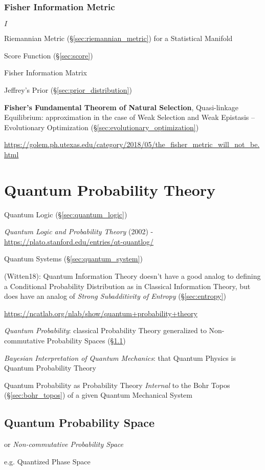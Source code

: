 \subsubsection{Fisher Information Metric}\label{sec:fisher_metric}

$I$

Riemannian Metric (\S\ref{sec:riemannian_metric}) for a Statistical Manifold

Score Function (\S\ref{sec:score})

Fisher Information Matrix

Jeffrey's Prior (\S\ref{sec:prior_distribution})

\fist \textbf{Fisher's Fundamental Theorem of Natural Selection},
Quasi-linkage Equilibrium: approximation in the case of Weak Selection
and Weak Epistasis -- Evolutionary Optimization
(\S\ref{sec:evolutionary_optimization}) %

\url{https://golem.ph.utexas.edu/category/2018/05/the_fisher_metric_will_not_be.html}



\section{Quantum Probability Theory}\label{sec:quantum_probability}

Quantum Logic (\S\ref{sec:quantum_logic})

\emph{Quantum Logic and Probability Theory} (2002) -
\url{https://plato.stanford.edu/entries/qt-quantlog/}

Quantum Systems (\S\ref{sec:quantum_system})

(Witten18): Quantum Information Theory doesn't have a good analog to defining a
Conditional Probability Distribution as in Classical Information Theory, but
does have an analog of \emph{Strong Subadditivity of Entropy}
(\S\ref{sec:entropy})

\url{https://ncatlab.org/nlab/show/quantum+probability+theory}

\emph{Quantum Probability}: classical Probability Theory generalized to
Non-commutative Probability Spaces (\S\ref{sec:quantum_probability_space})

\emph{Bayesian Interpretation of Quantum Mechanics}: that Quantum Physics is
Quantum Probability Theory

Quantum Probability as Probability Theory \emph{Internal} to the Bohr Topos
(\S\ref{sec:bohr_topos}) of a given Quantum Mechanical System



\subsection{Quantum Probability Space}\label{sec:quantum_probability_space}

or \emph{Non-commutative Probability Space}

e.g. Quantized Phase Space
